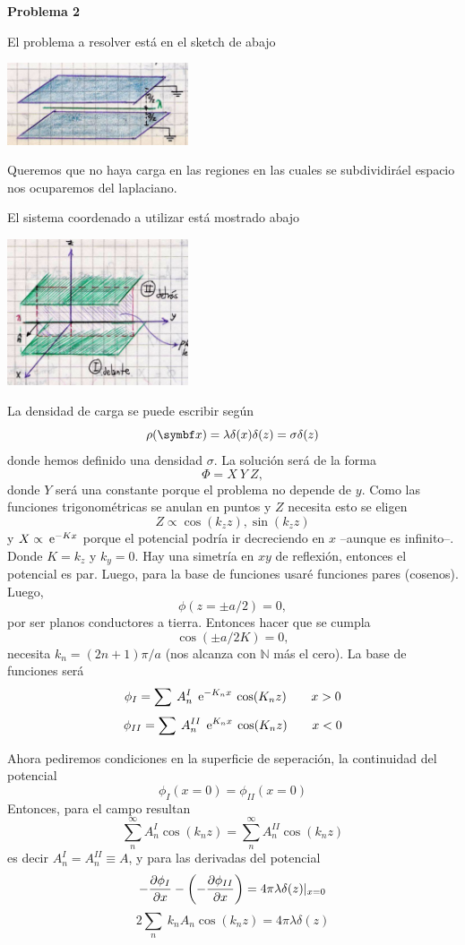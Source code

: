 \documentclass[10pt,oneside]{CBFT_book}
\begin{document}
\begin{ejemplo}{\bf Problema 2}

El problema a resolver está en el sketch de abajo

\includegraphics[width=0.4\textwidth]{images/fig_ft1_problema2_sep_A.jpg}

Queremos que no haya carga en las regiones en las cuales se subdividiráel
espacio nos ocuparemos del laplaciano.

El sistema coordenado a utilizar está mostrado abajo

\includegraphics[width=0.4\textwidth]{images/fig_ft1_problema2_sep_B.jpg}

La densidad de carga se puede escribir según
\[
	\rho(\vbx) = \lambda \delta(x) \delta(z) = \sigma \delta(z)
\]
donde hemos definido una densidad $\sigma$.
La solución será de la forma
\[
	\Phi = X \: Y \: Z,
\]
donde $Y$ será una constante porque el problema no depende de $y$.
Como las funciones trigonométricas se anulan en puntos y $Z$ necesita
esto se eligen
\[
	Z \propto \cos( k_z z ), \sin( k_z z )
\]
y $X \propto \:\mathrm{e}^{- K x} $ porque el potencial podría ir decreciendo
en $x$ --aunque es infinito--.
Donde $K=k_z$ y $k_y=0$. Hay una simetría en $xy$ de reflexión, entonces el
potencial es par. Luego, para la base de funciones usaré funciones pares
(cosenos).
Luego,
\[
	\phi(z=\pm a/2) = 0,
\]
por ser planos conductores a tierra. Entonces hacer que se cumpla
\[
	\cos(\pm a/2 K) = 0,
\]
necesita $k_n = ( 2n + 1 ) \pi / a$ (nos alcanza con $\mathbb{N}$ más el cero).
La base de funciones será
\[
	\phi_I = \sum \: A_n^I \: \:\mathrm{e}^{-K_n x} \: \cos(K_n z) \qquad 
	x > 0
\]
\[
	\phi_{II} = \sum \: A_n^{II} \: \:\mathrm{e}^{K_n x} \: \cos(K_n z) \qquad 
	x < 0
\]

Ahora pediremos condiciones en la superficie de seperación, la continuidad
del potencial
\[
	\phi_I( x=0 ) = \phi_{II}( x=0 )
\]
Entonces, para el campo resultan
\[
	\sum_n^\infty A_n^{I} \cos(k_nz) = 
	\sum_n^\infty A_n^{II} \cos(k_nz)
\]
es decir $A_n^{I}= A_n^{II} \equiv A$, y para las derivadas del potencial
\[
	- \frac{\partial^{\hspace{-0.05em}} {\phi_I}}{\partial {x}^{\hspace{-0.05em}}} - \left( - \frac{\partial^{\hspace{-0.05em}} {\phi_{II}}}{\partial {x}^{\hspace{-0.05em}}} \right) = 
	4 \pi \lambda \delta(z) |_{x=0}
\]
\[
	2 \sum_n \: k_n A_n \cos( k_n z ) = 4 \pi \lambda \delta(z)
\]


\end{ejemplo}
\end{document}
